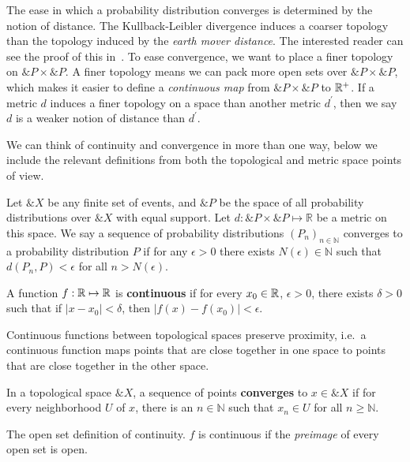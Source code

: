 The ease in which a probability distribution converges is determined
by the notion of distance.  The Kullback-Leibler divergence induces a
coarser topology than the topology induced by the \textit{earth mover
  distance}. The interested reader can see the proof of this
in~\cite{ref:arjovsky-2017}.  To ease convergence, we want to place a
finer topology on $\&P \times \&P$.  A finer topology means we can
pack more open sets over $\&P \times \&P$, which makes it easier to
define a \textit{continuous map} from $\&P \times \&P$ to $\mathbb{R}^+$.  If
a metric $d$ induces a finer topology on a space than another metric
$d^\prime$, then we say $d$ is a weaker notion of distance than
$d^\prime$.

We can think of continuity and convergence in more than one way, below
we include the relevant definitions from both the topological and
metric space points of view.

\begin{definition}
  Let $\&X$ be any finite set of events, and $\&P$ be the space of all
  probability distributions over $\&X$ with equal support. Let
  $d: \&P \times \&P \mapsto \mathbb{R}$ be a metric on this space. We
  say a sequence of probability distributions
  ${(P_n)}_{n \in \mathbb{N}}$ converges to a probability distribution
  $P$ if for any $\epsilon > 0$ there exists
  $N(\epsilon) \in \mathbb{N}$ such that $d(P_n,P) < \epsilon$ for all
  $n > N(\epsilon)$.
\end{definition}

\begin{definition}
  A function $f: \mathbb{R} \mapsto \mathbb{R}$ is \textbf{continuous} if for every
  $x_0 \in \mathbb{R}$, $\epsilon > 0$, there exists $\delta > 0$ such that if
  $|x - x_0| < \delta$, then $|f(x) - f(x_0)| < \epsilon$.
\end{definition}

Continuous functions between topological spaces preserve proximity,
i.e.\ a continuous function maps points that are close together in one
space to points that are close together in the other space.

\begin{definition}
  In a topological space $\&X$, a sequence of points
  \textbf{converges} to $x \in \&X$ if for every neighborhood $U$ of
  $x$, there is an $n \in \mathbb{N}$ such that $x_n \in U$ for all
  $n \geq \mathbb{N}$.
\end{definition}

The open set definition of continuity.  $f$ is continuous if the
\textit{preimage} of every open set is open.

